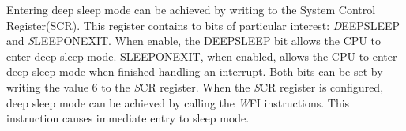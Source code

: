 Entering deep sleep mode can be achieved by writing to the System Control Register(SCR). This register contains to bits of particular interest: \emph DEEPSLEEP and \emph SLEEPONEXIT. When enable, the DEEPSLEEP bit allows the CPU to enter deep sleep mode. SLEEPONEXIT, when enabled, allows the CPU to enter deep sleep mode when finished handling an interrupt. Both bits can be set by writing the value 6 to the \emph SCR register. When the \emph SCR register is configured, deep sleep mode can be achieved by calling the \emph WFI instructions. This instruction causes immediate entry to sleep mode. 


   

















